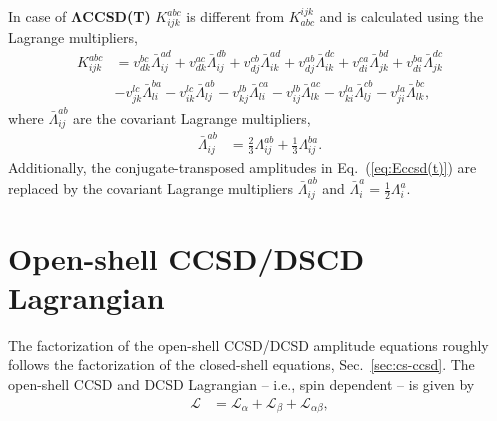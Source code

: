 \documentclass[a4paper,12pt,oneside]{book}
\newcommand{\eq}[1]{Eq.~(\ref{#1})}
\newcommand{\sect}[1]{Sec.~\ref{#1}}
\begin{document}
In case of \textbf{$\mathbf{\Lambda}$CCSD(T)} $K^{abc}_{ijk}$ is different from $K_{abc}^{ijk}$ and is 
calculated using the Lagrange multipliers,
\begin{equation}
\begin{aligned}
K^{abc}_{ijk} &= v_{dk}^{bc} \bar\Lambda_{ij}^{ad} + v_{dk}^{ac} \bar\Lambda_{ij}^{db} + v_{dj}^{cb} \bar\Lambda_{ik}^{ad} 
+ v_{dj}^{ab} \bar\Lambda_{ik}^{dc} + v_{di}^{ca} \bar\Lambda_{jk}^{bd} + v_{di}^{ba} \bar\Lambda_{jk}^{dc} \\
&- v_{jk}^{lc} \bar\Lambda_{li}^{ba} - v_{ik}^{lc} \bar\Lambda_{lj}^{ab} - v_{kj}^{lb} \bar\Lambda_{li}^{ca} 
- v_{ij}^{lb} \bar\Lambda_{lk}^{ac} - v_{ki}^{la} \bar\Lambda_{lj}^{cb} - v_{ji}^{la} \bar\Lambda_{lk}^{bc},
\end{aligned}
\end{equation}
where $\bar\Lambda_{ij}^{ab}$ are the covariant Lagrange multipliers,
\begin{equation}
\begin{aligned}
\bar \Lambda_{ij}^{ab} &= \frac{2}{3}\Lambda_{ij}^{ab} + \frac{1}{3} \Lambda_{ij}^{ba}.
\end{aligned}
\end{equation}
Additionally, the conjugate-transposed amplitudes in \eq{eq:Eccsd(t)} are replaced by the covariant 
Lagrange multipliers $\bar\Lambda_{ij}^{ab}$ and $\bar \Lambda_i^a = \frac{1}{2} \Lambda_i^a$.

\section{Open-shell CCSD/DSCD Lagrangian}
The factorization of the open-shell CCSD/DCSD amplitude equations roughly follows
the factorization of the closed-shell equations, \sect{sec:cs-ccsd}. 
The open-shell CCSD and DCSD Lagrangian -- i.e., spin dependent -- is given by
\begin{equation}
\begin{aligned}
\mathcal{L} &= \mathcal{L}_{\alpha} + \mathcal{L}_{\beta} + \mathcal{L}_{\alpha\beta},
\end{aligned}
\end{equation}
\end{document}
